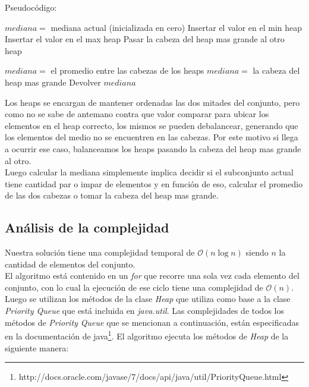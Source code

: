 Pseudocódigo:
\begin{algorithmic}
	\STATE $mediana =$ mediana actual (inicializada en cero)
			\STATE Insertar el valor en el min heap
		\ELSE
			\STATE Insertar el valor en el max heap
		\ENDIF
			\STATE Pasar la cabeza del heap mas grande al otro heap
		\ENDIF

			\STATE $mediana = $ el promedio entre las cabezas de los heaps
		\ELSE
			\STATE $mediana = $ la cabeza del heap mas grande
		\ENDIF
		\STATE Devolver $mediana$
	\ENDFOR
\end{algorithmic}


Los heaps se encargan de mantener ordenadas las dos mitades del conjunto, pero como no se sabe de antemano contra que valor comparar para ubicar los elementos en el heap correcto, los mismos se pueden debalancear, generando que los elementos del medio no se encuentren en las cabezas. Por este motivo si llega a ocurrir ese caso, balanceamos los heaps pasando la cabeza del heap mas grande al otro.\\

Luego calcular la mediana simplemente implica decidir si el subconjunto actual tiene cantidad par o impar de elementos y en función de eso, calcular el promedio de las dos cabezas o tomar la cabeza del heap mas grande.

\subsection{Análisis de la complejidad}
Nuestra solución tiene una complejidad temporal de $\mathcal{O}(n\log{}n)$ siendo $n$ la cantidad de elementos del conjunto. \\

El algoritmo está contenido en un \emph{for} que recorre una sola vez cada elemento del conjunto, con lo cual la ejecución de ese ciclo tiene una complejidad de $\mathcal{O}(n)$. Luego se utilizan los métodos de la clase \emph{Heap} que utiliza como base a la clase \emph{Priority Queue} que está incluida en \emph{java.util}. Las complejidades de todos los métodos de \emph{Priority Queue} que se mencionan a continuación, están especificadas en la documentación de java\footnote{http://docs.oracle.com/javase/7/docs/api/java/util/PriorityQueue.html}. El algoritmo ejecuta los métodos de \emph{Heap} de la siguiente manera:


